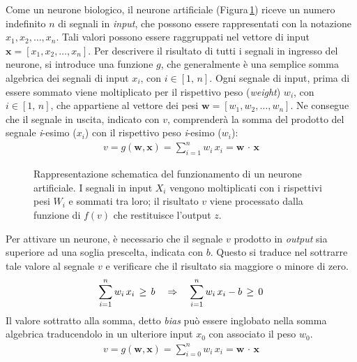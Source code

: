 Come un neurone biologico, il neurone artificiale (Figura\,\ref{fig:artificial-neuron}) riceve un numero indefinito $n$ di segnali in \textsl{input}, che possono essere rappresentati con la notazione $x_1, x_2, \dots, x_n$. Tali valori possono essere raggruppati nel vettore di input $\mathbf{x} = \left[x_1, x_2, \dots, x_n\right]$. Per descrivere il risultato di tutti i segnali in ingresso del neurone, si introduce una funzione $g$, che generalmente è una semplice somma algebrica dei segnali di input $x_i$, con $i\in[1,\,n]$. Ogni segnale di input, prima di essere sommato viene moltiplicato per il rispettivo peso (\textit{weight}) $w_i$, con $i\in[1,\,n]$, che appartiene al vettore dei pesi $\mathbf{w} = \left[w_1, w_2, \dots, w_n \right]$. Ne consegue che il segnale in uscita, indicato con $v$, comprenderà la somma del prodotto del segnale \textit{i}-esimo ($x_i$) con il rispettivo peso \textit{i}-esimo ($w_i$):
% 
\begin{gather}
    v = g\left(\mathbf{w}, \mathbf{x}\right) = \sum_{i = 1}^n w_i\,x_i = \mathbf{w}\,\cdot\,\mathbf{x}
    \label{eq:algebric-sum}
\end{gather}
% 
\begin{figure}[!b]
    \centering
    
    \caption[Rappresentazione schematica del funzionamento di un neurone artificiale.]{Rappresentazione schematica del funzionamento di un neurone artificiale. I segnali in input $X_i$ vengono moltiplicati con i rispettivi pesi $W_i$ e sommati tra loro; il risultato $v$ viene processato dalla funzione di $f(v)$ che restituisce l'output $z$.}\label{fig:artificial-neuron}
\end{figure}
% 
\noindent Per attivare un neurone, è necessario che il segnale $v$ prodotto in \textsl{output} sia superiore ad una soglia prescelta, indicata con $b$. Questo si traduce nel sottrarre tale valore al segnale $v$ e verificare che il risultato sia maggiore o minore di zero.
% 
\begin{gather}
    \sum_{i = 1}^n w_i\,x_i \,\geq\, b
    \hspace{10px} \Rightarrow \hspace{10px}
    \sum_{i = 1}^n w_i\,x_i - b \,\geq\, 0
\end{gather}
% 
\noindent Il valore sottratto alla somma, detto \textit{bias} può essere inglobato nella somma algebrica traducendolo in un ulteriore input $x_0$ con associato il peso $w_0$.
% 
\begin{gather}
    v = g\left(\mathbf{w}, \mathbf{x}\right) = \sum_{i = 0}^n w_i\,x_i = \mathbf{w}\,\cdot\,\mathbf{x}
\end{gather}
